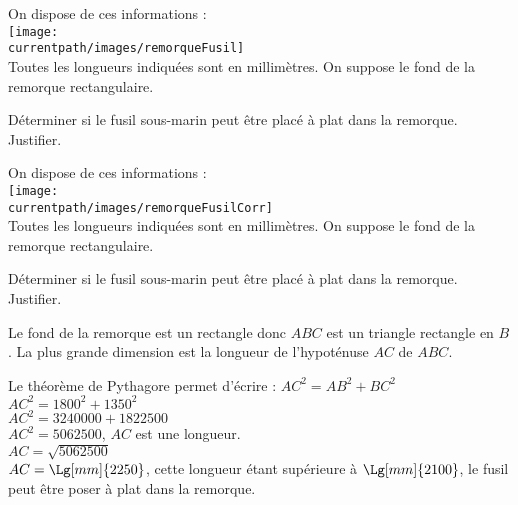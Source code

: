 \begin{exercice*}
    On dispose de ces informations :\\
    \texttt{[image: \\currentpath/images/remorqueFusil]}\\
    Toutes les longueurs indiquées sont en millimètres. On suppose le fond de la remorque rectangulaire.

    \medskip
    Déterminer si le fusil sous-marin peut être placé \og à plat \fg{} dans la remorque. Justifier.
\end{exercice*}
\begin{corrige}
        On dispose de ces informations :\\
    \texttt{[image: \\currentpath/images/remorqueFusilCorr]}\\
    Toutes les longueurs indiquées sont en millimètres. On suppose le fond de la remorque rectangulaire.

    \medskip
    Déterminer si le fusil sous-marin peut être placé \og à plat \fg{} dans la remorque. Justifier.

    {\red Le fond de la remorque est un rectangle donc $ABC$ est un triangle rectangle en $B$. La plus grande dimension est la longueur de l'hypoténuse $AC$ de $ABC$.

    Le théorème de Pythagore permet d'écrire : $AC^2=AB^2+BC^2$\\
    $AC^2=\num{1800}^2+\num{1350}^2$\\$AC^2=\num{3240000}+\num{1822500}$\\$AC^2=\num{5062500}$, $AC$ est une longueur.\\$AC=\sqrt{\num{5062500}}$\\
    $AC=\Lg[mm]{2250}$, cette longueur étant supérieure à $\Lg[mm]{2100}$, le fusil peut être poser à plat dans la remorque.    
    }
\end{corrige}

